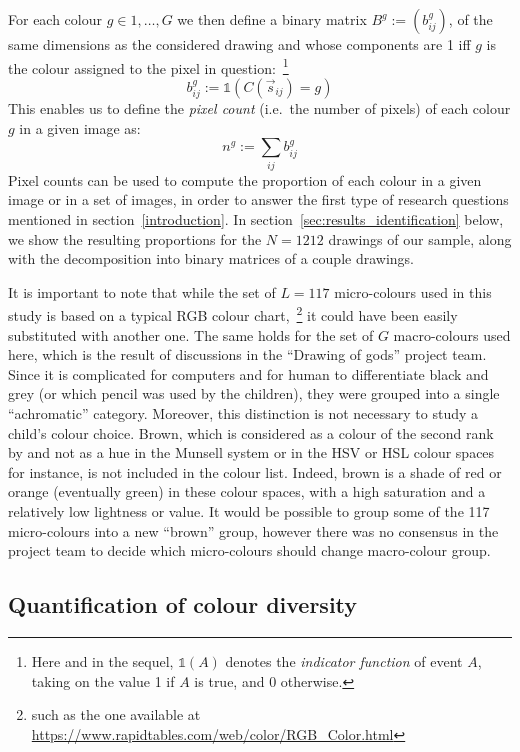\documentclass[11pt,a4paper]{article}
\begin{document}
For each colour $g\in 1, \dots, G$ we then define a binary matrix $B^{g} := (b_{ij}^{g})$, of the same dimensions as the considered drawing and whose components are 1 iff $g$ is the colour assigned to the pixel in question:~\footnote{Here and in the sequel, $\mathds{1}(A)$ denotes the \textit{indicator function} of event $A$, taking on the value 1 if $A$ is true, and 0 otherwise.}
\begin{equation}
	b_{ij}^{g} := \mathds{1}(C(\vec{s}_{ij}) = g)
\end{equation}
This enables us to define the \textit{pixel count} (i.e.~the number of pixels) of each colour $g$ in a given image as:
\begin{equation}
	n^{g} := \sum_{ij}b_{ij}^{g}
\end{equation}
Pixel counts can be used to compute the proportion of each colour in a given image or in a set of images, in order to answer the first type of research questions mentioned in section~\ref{introduction}. In section~\ref{sec:results_identification} below, we show the resulting proportions for the $N = 1212$ drawings of our sample, along with the decomposition into binary matrices of a couple drawings.

It is important to note that while the set of $L=117$ micro-colours used in this study is based on a typical RGB colour chart,~\footnote{such as the one available at \url{https://www.rapidtables.com/web/color/RGB_Color.html}} it could have been easily substituted with another one. The same holds for the set of $G$ macro-colours used here, which is the result of discussions in the ``Drawing of gods'' project team. Since it is complicated for computers and for human to differentiate black and grey (or which pencil was used by the children), they were grouped into a single ``achromatic'' category. Moreover, this distinction is not necessary to study a child's colour choice. Brown, which is considered as a colour of the second rank by \citet{pastoureau2017} and not as a hue in the Munsell system or in the HSV or HSL colour spaces for instance, is not included in the colour list. Indeed, brown is a shade of red or orange (eventually green) in these colour spaces, with a high saturation and a relatively low lightness or value. It would be possible to group some of the 117 micro-colours into a new ``brown'' group, however there was no consensus in the project team to decide which micro-colours should change macro-colour group.

\subsection{Quantification of colour diversity}
\label{sec:diversity}
\end{document}
